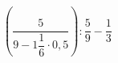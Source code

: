 \begin{ex}[type=calculate]
	\begin{condition}
		\( \left( \dfrac{5}{9-1\dfrac{1}{6}\cdot0,5} \right):\dfrac{5}{9}-\dfrac{1}{3} \)
	\end{condition}
\end{ex}